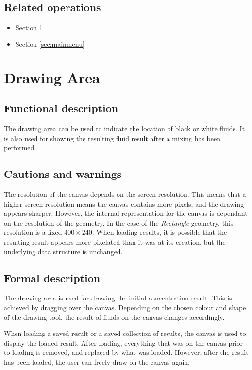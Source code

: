   \subsection*{Related operations}
  \begin{itemize}
    \item Section \ref{sec:drawingarea}
    \item Section \ref{sec:mainmenu}
  \end{itemize}

\section{Drawing Area}
\label{sec:drawingarea}
  \subsection*{Functional description}
  The drawing area can be used to indicate the location of black or white fluids. It is also used for showing the resulting fluid result after a mixing has been performed.
  
  \subsection*{Cautions and warnings}
  The resolution of the canvas depends on the screen resolution. This means that a higher screen resolution means the canvas contains more pixels, and the drawing appears sharper. However, the internal representation for the canvas is dependant on the resolution of the geometry. In the case of the \emph{Rectangle} geometry, this resolution is a fixed $400 \times 240$. When loading results, it is possible that the resulting result appears more pixelated than it was at its creation, but the underlying data structure is unchanged.
  
  \subsection*{Formal description}
  The drawing area is used for drawing the initial concentration result. This is achieved by dragging over the canvas. Depending on the chosen colour and shape of the drawing tool, the result of fluids on the canvas changes accordingly.
  
  When loading a saved result or a saved collection of results, the canvas is used to display the loaded result. After loading, everything that was on the canvas prior to loading is removed, and replaced by what was loaded. However, after the result has been loaded, the user can freely draw on the canvas again.

